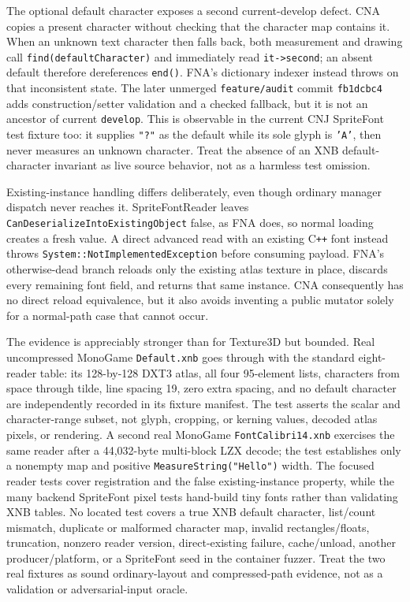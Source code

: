 The optional default character exposes a second current-develop defect. CNA copies a present
character without checking that the character map contains it. When an unknown text character
then falls back, both measurement and drawing call \texttt{find(defaultCharacter)} and immediately
read \texttt{it->second}; an absent default therefore dereferences \texttt{end()}. FNA's
dictionary indexer instead throws on that inconsistent state. The later unmerged
\texttt{feature/audit} commit \texttt{fb1dcbc4} adds construction/setter validation and a checked
fallback, but it is not an ancestor of current \texttt{develop}. This is observable in the
current CNJ SpriteFont test fixture too: it supplies \texttt{"?"} as the default while its sole
glyph is \texttt{'A'}, then never measures an unknown character. Treat the absence of an XNB
default-character invariant as live source behavior, not as a harmless test omission.

Existing-instance handling differs deliberately, even though ordinary manager dispatch never
reaches it. SpriteFontReader leaves \texttt{CanDeserializeIntoExistingObject} false, as FNA
does, so normal  loading creates a fresh value. A direct advanced read
with an existing C\texttt{++} font instead throws \texttt{System::NotImplementedException} before
consuming payload. FNA's otherwise-dead branch reloads only the existing atlas texture in place,
discards every remaining font field, and returns that same instance. CNA consequently has no
direct reload equivalence, but it also avoids inventing a public mutator solely for a normal-path
case that cannot occur.

The evidence is appreciably stronger than for Texture3D but bounded. Real uncompressed MonoGame
\texttt{Default.xnb} goes through  with the standard eight-reader table:
its 128-by-128 DXT3 atlas, all four 95-element lists, characters from space through tilde,
line spacing 19, zero extra spacing, and no default character are independently recorded in its
fixture manifest. The test asserts the scalar and character-range subset, not glyph, cropping, or
kerning values, decoded atlas pixels, or rendering. A second real MonoGame
\texttt{FontCalibri14.xnb} exercises the same reader after a 44,032-byte multi-block LZX decode;
the test establishes only a nonempty map and positive \texttt{MeasureString("Hello")} width.
The focused reader tests cover registration and the false existing-instance property, while the
many backend SpriteFont pixel tests hand-build tiny fonts rather than validating XNB tables. No
located test covers a true XNB default character, list/count mismatch, duplicate or malformed
character map, invalid rectangles/floats, truncation, nonzero reader version, direct-existing
failure, cache/unload, another producer/platform, or a SpriteFont seed in the container fuzzer.
Treat the two real fixtures as sound ordinary-layout and compressed-path evidence, not as a
validation or adversarial-input oracle.

